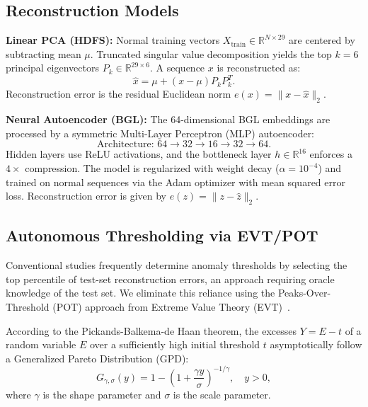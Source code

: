 \documentclass[conference]{IEEEtran}
\begin{document}
\subsection{Reconstruction Models}
\textbf{Linear PCA (HDFS):} Normal training vectors $X_{\text{train}} \in \mathbb{R}^{N \times 29}$ are centered by subtracting mean $\mu$. Truncated singular value decomposition yields the top $k=6$ principal eigenvectors $P_k \in \mathbb{R}^{29 \times 6}$. A sequence $x$ is reconstructed as:
\begin{equation}
\hat{x} = \mu + (x - \mu) P_k P_k^T.
\end{equation}
Reconstruction error is the residual Euclidean norm $e(x) = \|x - \hat{x}\|_2$.

\textbf{Neural Autoencoder (BGL):} The 64-dimensional BGL embeddings are processed by a symmetric Multi-Layer Perceptron (MLP) autoencoder:
\begin{equation}
\text{Architecture: } 64 \to 32 \to 16 \to 32 \to 64.
\end{equation}
Hidden layers use ReLU activations, and the bottleneck layer $h \in \mathbb{R}^{16}$ enforces a $4\times$ compression. The model is regularized with weight decay ($\alpha = 10^{-4}$) and trained on normal sequences via the Adam optimizer with mean squared error loss. Reconstruction error is given by $e(z) = \|z - \hat{z}\|_2$.

\subsection{Autonomous Thresholding via EVT/POT}
Conventional studies frequently determine anomaly thresholds by selecting the top percentile of test-set reconstruction errors, an approach requiring oracle knowledge of the test set. We eliminate this reliance using the Peaks-Over-Threshold (POT) approach from Extreme Value Theory (EVT)~\cite{siffer2017anomaly}.

According to the Pickands-Balkema-de Haan theorem, the excesses $Y = E - t$ of a random variable $E$ over a sufficiently high initial threshold $t$ asymptotically follow a Generalized Pareto Distribution (GPD):
\begin{equation}
G_{\gamma, \sigma}(y) = 1 - \left(1 + \frac{\gamma y}{\sigma}\right)^{-1/\gamma}, \quad y > 0,
\end{equation}
where $\gamma$ is the shape parameter and $\sigma$ is the scale parameter.
\end{document}
